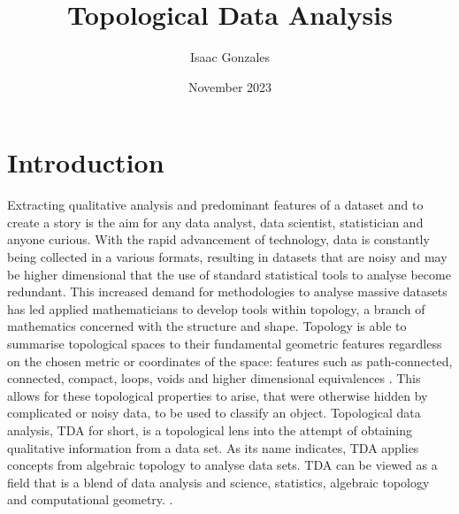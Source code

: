 \documentclass{article}
\title{Topological Data Analysis}
\author{Isaac Gonzales}
\date{November 2023}
\begin{document}
\maketitle
{}
\newpage

\tableofcontents

\clearpage

\section{Introduction}
Extracting qualitative analysis and predominant features of a dataset and to create a story is the aim for any data analyst, data scientist, statistician and anyone curious. With the rapid advancement of technology, data is constantly being collected in a various formats, resulting in datasets that are noisy and may be higher dimensional that the use of standard statistical tools to analyse become redundant\cite{IntroTDADATAscientists}. This increased demand for methodologies to analyse massive datasets has led applied mathematicians to develop tools within topology, a branch of mathematics concerned with the structure and shape. Topology is able to summarise topological spaces to their fundamental geometric features regardless on the chosen metric or coordinates of the space\cite{CarlssonAMS}: features such as path-connected, connected, compact, loops, voids and higher dimensional equivalences \cite{Hatcher}\cite{HSchenckAlgebraicFound}. This allows for these topological properties to arise, that were otherwise hidden by complicated or noisy data, to be used to classify an object. Topological data analysis, TDA for short, is a topological lens into the attempt of obtaining qualitative information from a data set. As its name indicates, TDA applies concepts from algebraic topology to analyse data sets. TDA can be viewed as a field that is a blend of data analysis and science, statistics, algebraic topology and computational geometry. \cite{NINARoadmap}\cite{smith2020topological}. \\ 
\end{document}
